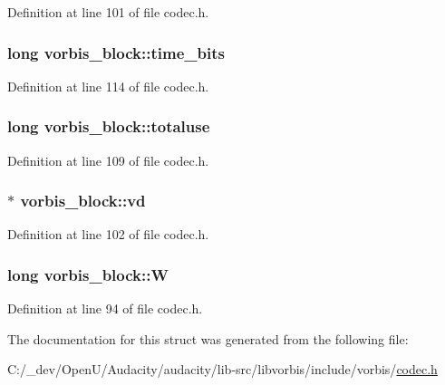 Definition at line 101 of file codec.\+h.

\subsubsection[{\texorpdfstring{time\+\_\+bits}{time_bits}}]{\setlength{\rightskip}{0pt plus 5cm}long vorbis\+\_\+block\+::time\+\_\+bits}\hypertarget{structvorbis__block_ab92eba2cf1a653478630617ddad97f88}{}\label{structvorbis__block_ab92eba2cf1a653478630617ddad97f88}


Definition at line 114 of file codec.\+h.

\subsubsection[{\texorpdfstring{totaluse}{totaluse}}]{\setlength{\rightskip}{0pt plus 5cm}long vorbis\+\_\+block\+::totaluse}\hypertarget{structvorbis__block_a24008023c086b4a0eb8b72761cfcf338}{}\label{structvorbis__block_a24008023c086b4a0eb8b72761cfcf338}


Definition at line 109 of file codec.\+h.

\subsubsection[{\texorpdfstring{vd}{vd}}]{$\ast$ vorbis\+\_\+block\+::vd}\hypertarget{structvorbis__block_adefe79be61ef3631c18cd7b8afae31a2}{}\label{structvorbis__block_adefe79be61ef3631c18cd7b8afae31a2}


Definition at line 102 of file codec.\+h.

\subsubsection[{\texorpdfstring{W}{W}}]{\setlength{\rightskip}{0pt plus 5cm}long vorbis\+\_\+block\+::W}\hypertarget{structvorbis__block_a1e420440dd6a5a39262c0fe7afa8435a}{}\label{structvorbis__block_a1e420440dd6a5a39262c0fe7afa8435a}


Definition at line 94 of file codec.\+h.



The documentation for this struct was generated from the following file\+:\begin{DoxyCompactItemize}
\item 
C\+:/\+\_\+dev/\+Open\+U/\+Audacity/audacity/lib-\/src/libvorbis/include/vorbis/\hyperlink{codec_8h}{codec.\+h}\end{DoxyCompactItemize}
